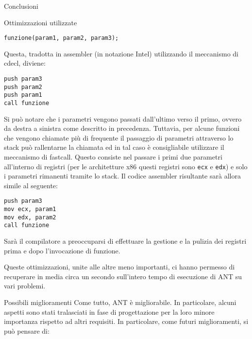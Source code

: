 \begin{chapter}{Conclusioni}
\begin{section}{Ottimizzazioni utilizzate}
\begin{verbatim}
funzione(param1, param2, param3);
\end{verbatim}

\noindent Questa, tradotta in assembler (in notazione Intel) utilizzando il meccanismo di
cdecl, diviene:

\begin{verbatim}
push param3
push param2
push param1
call funzione
\end{verbatim}

\noindent Si pu\`o notare che i parametri vengono passati dall'ultimo verso il primo,
ovvero da destra a sinistra come descritto in precedenza. Tuttavia, per alcune funzioni
che vengono chiamate pi\`u di frequente il passaggio di parametri attraverso lo stack
pu\`o rallentarne la chiamata ed in tal caso \`e consigliabile utilizzare il meccanismo
di fastcall. Questo consiste nel passare i primi due parametri all'interno di registri
(per le architetture x86 questi registri sono \verb,ecx, e \verb,edx,) e solo i parametri
rimanenti tramite lo stack. Il codice assembler risultante sar\`a allora simile al
seguente:

\begin{verbatim}
push param3
mov ecx, param1
mov edx, param2
call funzione
\end{verbatim}

\noindent Sar\`a il compilatore a preoccuparsi di effettuare la gestione e la pulizia
dei registri prima e dopo l'invocazione di funzione.

Queste ottimizzazioni, unite alle altre meno importanti, ci hanno permesso di recuperare in
media circa un secondo sull'intero tempo di esecuzione di ANT su vari problemi.

\end{section}

\begin{section}{Possibili miglioramenti}
Come tutto, ANT \`e migliorabile. In particolare, alcuni aspetti sono stati
tralasciati in fase di progettazione per la loro minore importanza rispetto
ad altri requisiti. In particolare, come futuri miglioramenti, si pu\`o
pensare di:


\end{section}
\end{chapter}
